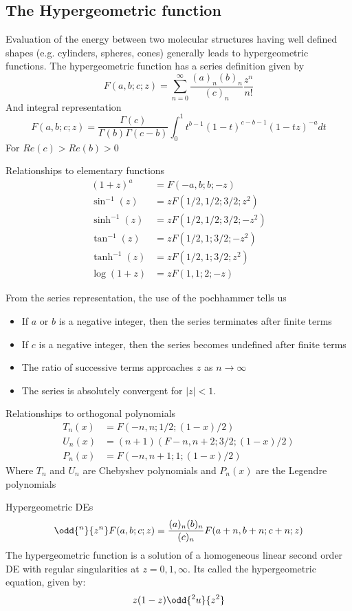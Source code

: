 \documentclass{E:/Documents/Latex/myassignment}
\begin{document}
\subsection{The Hypergeometric function}
Evaluation of the energy between two molecular structures having well defined shapes (e.g. cylinders, spheres, cones) generally leads to hypergeometric functions. The hypergeometric function has a series definition given by
\[F(a,b;c;z) = \sum_{n=0}^\infty \frac{(a)_n (b)_n}{(c)_n} \frac{z^n}{n!}\]
And integral representation
\[F(a,b;c;z) = \frac{\Gamma(c)}{\Gamma(b)\Gamma(c-b)} \int_0^1 t^{b-1}(1-t)^{c-b-1}(1-tz)^{-a} dt\]
For $Re(c) > Re(b) > 0$

Relationships to elementary functions
\begin{align*}
	(1+z)^a &= F(-a,b;b;-z)\\
	\sin^{-1}(z) &= zF(1/2,1/2;3/2;z^2)\\
	\sinh^{-1}(z) &= zF(1/2,1/2;3/2;-z^2)\\
	\tan^{-1}(z) &= zF(1/2,1;3/2;-z^2)\\
	\tanh^{-1}(z) &= zF(1/2,1;3/2;z^2)\\
	\log(1+z) &= zF(1,1;2;-z)
\end{align*}

From the series representation, the use of the pochhammer tells us
\begin{itemize}
	\item If $a$ or $b$ is a negative integer, then the series terminates after finite terms
	\item If $c$ is a negative integer, then the series becomes undefined after finite terms
	\item The ratio of successive terms approaches $z$ as $n\to\infty$
	\item The series is absolutely convergent for $|z| <1$.
\end{itemize}


Relationships to orthogonal polynomials
\begin{align*}
	T_n(x) &= F(-n,n;1/2;(1-x)/2)\\
	U_n(x) &= (n+1)(F-n,n+2;3/2;(1-x)/2)\\
	P_n(x) &= F(-n,n+1;1;(1-x)/2)
\end{align*}
Where $T_n$ and $U_n$ are Chebyshev polynomials and $P_n(x)$ are the Legendre polynomials


Hypergeometric DEs 
\[\odd{^n}{z^n} F(a,b;c;z) = \frac{(a)_n (b)_n}{(c)_n} F(a+n,b+n;c+n;z)\]
The hypergeometric function is a solution of a homogeneous linear second order DE with regular singularities at $z=0,1,\infty$. Its called the hypergeometric equation, given by:
\[z(1-z) \odd{^2u}{z^2}\]
\end{document}
